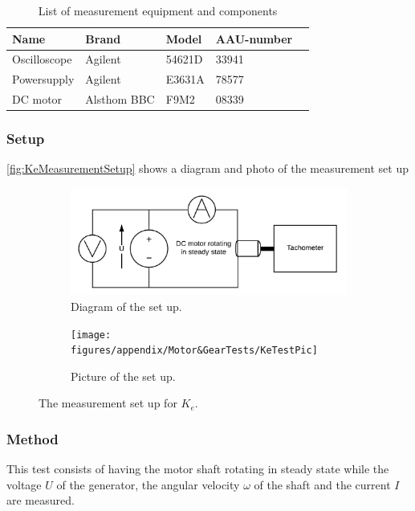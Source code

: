 \begin{table}[htbp]
	\centering
	\caption{List of measurement equipment and components}\label{tab_appendix:KeSetUp}
	
	\begin{tabularx}{\textwidth}{lXXXX}
		Name 				& Brand	& Model & AAU-number									\\ \toprule \rowcolor{lightGrey}
		Oscilloscope	& Agilent & 54621D & 33941 	\\
		Powersupply	& Agilent & E3631A & 78577\\ \rowcolor{lightGrey}
		DC motor & Alsthom BBC & F9M2& 08339
	\end{tabularx}
\end{table}

\subsubsection*{Setup}
\autoref{fig:KeMeasurementSetup} shows a diagram and photo of the measurement set up
\begin{figure}[htbp]
	\centering
	\begin{subfigure}{0.50\textwidth}
		\includegraphics[width=\textwidth]{figures/appendix/Motor&GearTests/KeTestSetUp}
		\caption{Diagram of the set up.} \label{fig:KeMeasurementDiagram}
	\end{subfigure}
	\begin{subfigure}{0.40\textwidth}
		\texttt{[image: figures/appendix/Motor\&GearTests/KeTestPic]}
		\caption{Picture of the set up.} \label{fig:KeMeasurementPictures}
	\end{subfigure}
	\caption{The measurement set up for $K_e$.} \label{fig:KeMeasurementSetup}   
\end{figure}

\subsubsection*{Method}
This test consists of having the motor shaft rotating in steady state while the voltage $U$ of the generator, the angular velocity $\omega$ of the shaft and the current $I$ are measured.


